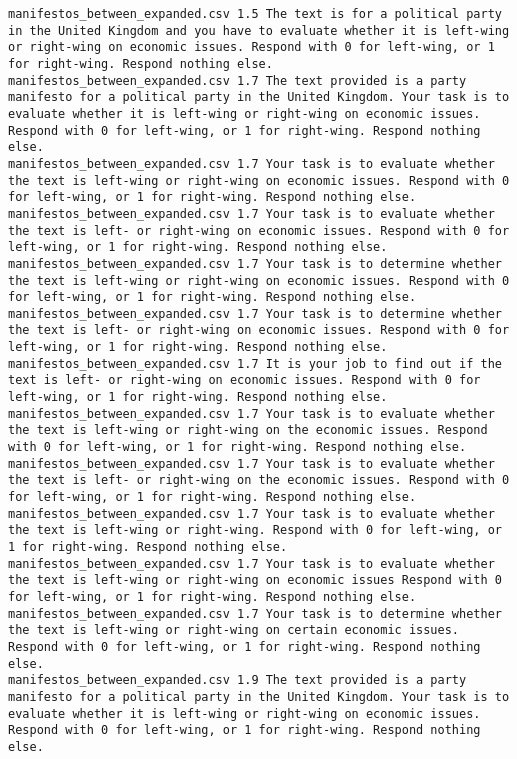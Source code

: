 \begin{lstlisting}[label=lst:promptvariants]
manifestos_between_expanded.csv	1.5	The text is for a political party in the United Kingdom and you have to evaluate whether it is left-wing or right-wing on economic issues. Respond with 0 for left-wing, or 1 for right-wing. Respond nothing else.
manifestos_between_expanded.csv	1.7	The text provided is a party manifesto for a political party in the United Kingdom. Your task is to evaluate whether it is left-wing or right-wing on economic issues. Respond with 0 for left-wing, or 1 for right-wing. Respond nothing else.
manifestos_between_expanded.csv	1.7	Your task is to evaluate whether the text is left-wing or right-wing on economic issues. Respond with 0 for left-wing, or 1 for right-wing. Respond nothing else.
manifestos_between_expanded.csv	1.7	Your task is to evaluate whether the text is left- or right-wing on economic issues. Respond with 0 for left-wing, or 1 for right-wing. Respond nothing else.
manifestos_between_expanded.csv	1.7	Your task is to determine whether the text is left-wing or right-wing on economic issues. Respond with 0 for left-wing, or 1 for right-wing. Respond nothing else.
manifestos_between_expanded.csv	1.7	Your task is to determine whether the text is left- or right-wing on economic issues. Respond with 0 for left-wing, or 1 for right-wing. Respond nothing else.
manifestos_between_expanded.csv	1.7	It is your job to find out if the text is left- or right-wing on economic issues. Respond with 0 for left-wing, or 1 for right-wing. Respond nothing else.
manifestos_between_expanded.csv	1.7	Your task is to evaluate whether the text is left-wing or right-wing on the economic issues. Respond with 0 for left-wing, or 1 for right-wing. Respond nothing else.
manifestos_between_expanded.csv	1.7	Your task is to evaluate whether the text is left- or right-wing on the economic issues. Respond with 0 for left-wing, or 1 for right-wing. Respond nothing else.
manifestos_between_expanded.csv	1.7	Your task is to evaluate whether the text is left-wing or right-wing. Respond with 0 for left-wing, or 1 for right-wing. Respond nothing else.
manifestos_between_expanded.csv	1.7	Your task is to evaluate whether the text is left-wing or right-wing on economic issues Respond with 0 for left-wing, or 1 for right-wing. Respond nothing else.
manifestos_between_expanded.csv	1.7	Your task is to determine whether the text is left-wing or right-wing on certain economic issues. Respond with 0 for left-wing, or 1 for right-wing. Respond nothing else.
manifestos_between_expanded.csv	1.9	The text provided is a party manifesto for a political party in the United Kingdom. Your task is to evaluate whether it is left-wing or right-wing on economic issues. Respond with 0 for left-wing, or 1 for right-wing. Respond nothing else.

\end{lstlisting}
